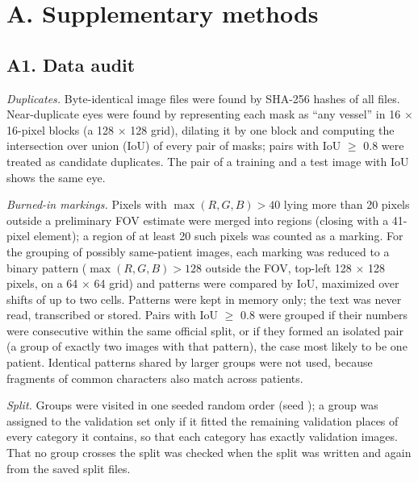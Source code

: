 \section*{A. Supplementary methods}

\subsection*{A1. Data audit}
\emph{Duplicates.} Byte-identical image files were found by SHA-256 hashes of all \NImages{} files. Near-duplicate eyes were
found by representing each mask as ``any vessel'' in 16 $\times$ 16-pixel blocks (a 128 $\times$ 128 grid), dilating it by
one block and computing the intersection over union (IoU) of every pair of masks; pairs with IoU $\geq$ 0.8 were treated
as candidate duplicates.
The pair of a training and a test image with IoU \SameEyeIoU{} shows the same eye.

\emph{Burned-in markings.} Pixels with $\max(R, G, B) > 40$ lying more than 20 pixels outside a preliminary FOV estimate
were merged into regions (closing with a 41-pixel element); a region of at least 20 such pixels was counted as a marking.
For the grouping of possibly same-patient images, each marking was reduced to a binary pattern ($\max(R, G, B) > 128$
outside the FOV, top-left 128 $\times$ 128 pixels, on a 64 $\times$ 64 grid) and patterns were compared by IoU, maximized
over shifts of up to two cells. Patterns were kept in memory only; the text was never read, transcribed or stored. Pairs
with IoU $\geq$ 0.8 were grouped if their numbers were consecutive within the same official split, or if they formed an
isolated pair (a group of exactly two images with that pattern), the case most likely to be one patient. Identical
patterns shared by larger groups were not used, because fragments of common characters also match across patients.

\emph{Split.} Groups were visited in one seeded random order (seed \SplitSeed{}); a group was assigned to the validation set
only if it fitted the remaining validation places of every category it contains, so that each category has exactly
\NValPerCategory{} validation images. That no group crosses the split was checked when the split was written and again
from the saved split files.

